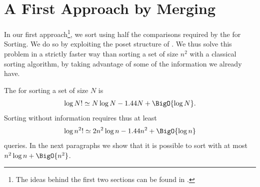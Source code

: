 \section{A First Approach by Merging}
\label{tree:xy:merge}

In our first approach\footnote{
The ideas behind the first two sections can be found in
\citet*{harper:1975}.
}, we sort \XY using half
the comparisons required by the \ITLB for Sorting. We do so by exploiting the
poset structure of \XY.
We thus solve this problem in a strictly faster way than sorting a set of size
\(n^2\)
with a classical sorting algorithm, by taking advantage of some of the information we already have.

The \ITLB for sorting a set of size \(N\) is
\begin{displaymath}
\log N! \simeq N \log N - 1.44 N + \BigO{\log N}.
\end{displaymath}
Sorting \XY without information requires thus at least
\begin{displaymath}
\log n^2! \simeq 2 n^2 \log n - 1.44 n^2 + \BigO{\log n}
\end{displaymath}
queries.
In the next paragraphs we show that it is possible to sort \XY
with at most \(n^2 \log n + \BigO{n^2}\).

